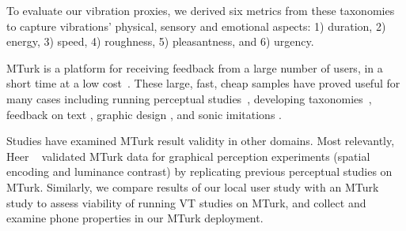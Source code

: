 To evaluate our vibration proxies, we derived six metrics from these taxonomies to capture vibrations' physical, sensory and emotional aspects:  
1) duration, 2) energy, 3) speed, 4) roughness, 5) pleasantness, and 6) urgency. 


MTurk is a platform for receiving feedback from a large number of users, in a short time at a low cost~\cite{mutrkgeneral,visualperceptionturk}. These large, fast, cheap samples have proved useful for many cases including running perceptual studies~\cite{visualperceptionturk}, developing taxonomies~\cite{taxonomyturk}, feedback on text \cite{Siangliulue2015}, graphic design \cite{Xu2014}, and sonic imitations \cite{Cartwright2015}.


Studies have examined MTurk result validity in other domains. 
Most relevantly, Heer \etal~\cite{visualperceptionturk} validated MTurk data for graphical perception experiments (spatial encoding and luminance contrast) by replicating previous perceptual studies on MTurk. %
Similarly, we compare results of our local user study with an MTurk study to assess viability of running VT studies on MTurk, and collect and examine phone properties in our MTurk deployment. 

